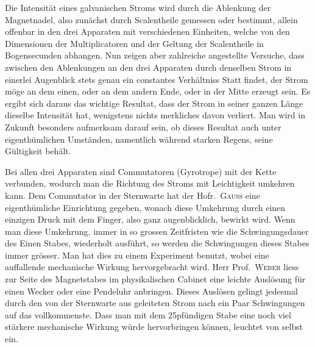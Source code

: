 Die Intensität eines galvanischen Stroms wird durch die Ablenkung der Magnetnadel, also zunächst durch Scalentheile gemessen oder bestimmt, allein
offenbar in den drei Apparaten mit verschiedenen Einheiten, welche von den Dimensionen der Multiplicatoren und der Geltung der Scalentheile in Bogensecunden abhangen. Nun zeigen aber zahlreiche angestellte Versuche, dass zwischen den Ablenkungen an den drei Apparaten durch denselben Strom in einerlei Augenblick stets genau ein constantes Verhältniss Statt findet, der Strom möge an dem einen, oder an dem andern Ende, oder in der Mitte erzeugt sein. Es ergibt sich daraus das wichtige Resultat, dass der Strom in seiner ganzen Länge dieselbe Intensität hat, wenigstens nichts merkliches davon verliert. Man wird in Zukunft besonders aufmerksam darauf sein, ob dieses Resultat auch unter eigenthümlichen Umständen, namentlich während starken Regens, seine Gültigkeit behält.

Bei allen drei Apparaten sind Commutatoren (Gyrotrope) mit der Kette verbunden, wodurch man die Richtung des Stroms mit Leichtigkeit umkehren kann. Dem Commutator in der Sternwarte hat der Hofr.\ \textsc{Gauss} eine eigenthümliche Einrichtung gegeben, wonach diese Umkehrung durch einen einzigen Druck mit dem Finger, also ganz augenblicklich, bewirkt wird. Wenn man diese Umkehrung, immer in so grossen Zeitfristen wie die Schwingungsdauer des Einen Stabes, wiederholt ausführt, so werden die Schwingungen dieses Stabes immer grösser. Man hat dies zu einem Experiment benutzt, wobei eine auffallende mechanische Wirkung hervorgebracht wird. Herr Prof.\ \textsc{Weber} liess zur Seite des Magnetstabes im physikalischen Cabinet eine leichte Auslösung für einen Wecker oder eine Pendeluhr anbringen. Dieses Auslösen gelingt jedesmal durch den von der Sternwarte aus geleiteten Strom nach ein Paar Schwingungen auf das vollkommenste. Dass man mit dem 25pfündigen Stabe eine noch viel stärkere mechanische Wirkung würde hervorbringen können, leuchtet von selbst ein.

